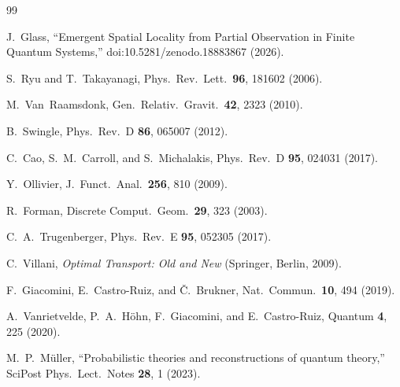 \documentclass[aps,pra,twocolumn,superscriptaddress]{revtex4-2}
\begin{document}
\begin{thebibliography}{99}

J.~Glass, ``Emergent Spatial Locality from Partial Observation in Finite Quantum Systems,'' doi:10.5281/zenodo.18883867 (2026).

S.~Ryu and T.~Takayanagi, Phys.\ Rev.\ Lett.\ \textbf{96}, 181602 (2006).

M.~Van~Raamsdonk, Gen.\ Relativ.\ Gravit.\ \textbf{42}, 2323 (2010).

B.~Swingle, Phys.\ Rev.\ D \textbf{86}, 065007 (2012).

C.~Cao, S.~M.~Carroll, and S.~Michalakis, Phys.\ Rev.\ D \textbf{95}, 024031 (2017).

Y.~Ollivier, J.\ Funct.\ Anal.\ \textbf{256}, 810 (2009).

R.~Forman, Discrete Comput.\ Geom.\ \textbf{29}, 323 (2003).

C.~A.~Trugenberger, Phys.\ Rev.\ E \textbf{95}, 052305 (2017).

C.~Villani, \textit{Optimal Transport: Old and New} (Springer, Berlin, 2009).

F.~Giacomini, E.~Castro-Ruiz, and \v{C}.~Brukner, Nat.\ Commun.\ \textbf{10}, 494 (2019).

A.~Vanrietvelde, P.~A.~H\"ohn, F.~Giacomini, and E.~Castro-Ruiz, Quantum \textbf{4}, 225 (2020).

M.~P.~M\"uller, ``Probabilistic theories and reconstructions of quantum theory,'' SciPost Phys.\ Lect.\ Notes \textbf{28}, 1 (2023).

\end{thebibliography}
\end{document}
